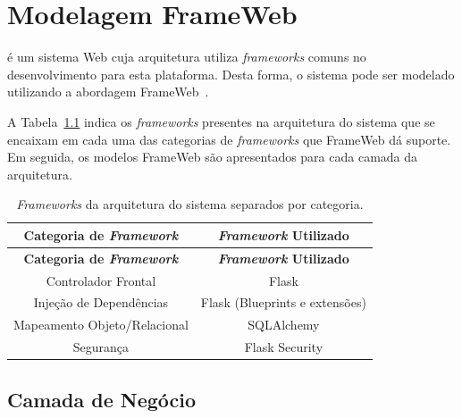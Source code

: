 \chapter{Modelagem FrameWeb}
\label{sec-frameweb}
\vspace{-1cm}

\emph{\imprimirtitulo} é um sistema Web cuja arquitetura utiliza \textit{frameworks} comuns no desenvolvimento para esta plataforma. Desta forma, o sistema pode ser modelado utilizando a abordagem FrameWeb~\cite{souza-celebratingfalbo20}.

A Tabela~\ref{tabela-frameworks} indica os \textit{frameworks} presentes na arquitetura do sistema que se encaixam em cada uma das categorias de \textit{frameworks} que FrameWeb dá suporte. Em seguida, os modelos FrameWeb são apresentados para cada camada da arquitetura.

\begin{footnotesize}
	\begin{longtable}{|c|c|}
		\caption{\textit{Frameworks} da arquitetura do sistema separados por categoria.}
		\label{tabela-frameworks}\\\hline
		
		\rowcolor{lightgray}
		\textbf{Categoria de \textit{Framework}} & \textbf{\textit{Framework} Utilizado} \\\hline 
		\endfirsthead
		\hline
		\rowcolor{lightgray}
		\textbf{Categoria de \textit{Framework}} & \textbf{\textit{Framework} Utilizado} \\\hline 
		\endhead

		Controlador Frontal & Flask \\\hline

		Injeção de Dependências & Flask (Blueprints e extensões) \\\hline

		Mapeamento Objeto/Relacional & SQLAlchemy \\\hline

		Segurança & Flask Security \\\hline
	\end{longtable}
\end{footnotesize}

\section{Camada de Negócio}
\label{sec-frameweb-negocio}


